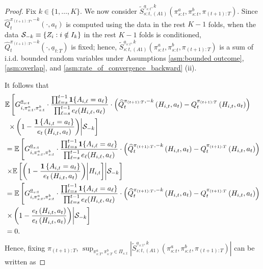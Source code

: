 \begin{proof}
Fix $k \in \{1,\ldots,K\}$. We now consider $\widetilde{S}_{s:t,(A1)}^{\underline{a}_{s:t},k}(\pi_{s:t}^{a},\pi_{s:t}^{b},\pi_{(t+1):T})$. Since $\widehat{Q}_{t}^{\pi_{(t+1):T},-k}(\cdot,a_{t})$ is computed using the data in the rest $K-1$ folds, when the data $\mathcal{S}_{-k} \equiv \{Z_i : i \notin I_{k}\}$ in the rest $K-1$ folds is conditioned,  $\widehat{Q}_{t}^{\pi_{(t+1):T},-k}(\cdot,\underline{a}_{t:T})$ is fixed; hence, $\widetilde{S}_{s:t,(A1)}^{\underline{a}_{s:t},k}(\pi_{s:t}^{a},\pi_{s:t}^{b},\pi_{(t+1):T})$ is a sum of i.i.d. bounded random variables under Assumptions \ref{asm:bounded outcome}, \ref{asm:overlap}, and \ref{asm:rate_of_convergence_backward} (ii).

It follows that 
\begin{align*}
&\mathbb{E}\left[G_{i,\pi_{s:t}^{a},\pi_{s:t}^{b}}^{\underline{a}_{s:t}}\cdot\frac{\prod_{\ell=s}^{t-1}\mathbf{1}\{A_{i,\ell}=a_{\ell}\}}{\prod_{\ell=s}^{t-1}e_{\ell}(H_{i,\ell},a_{\ell})}\cdot\left(\widehat{Q}_{t}^{\pi_{(t+1):T},-k}\left(H_{i,t},a_{t}\right)-Q_{t}^{\pi_{(t+1):T}}\left(H_{i,t},a_{t}\right)\right) \right. \\ & \left. \  \times \left(1-\frac{\mathbf{1}\left\{ A_{i,t}=a_{t}\right\} }{e_{t}\left(H_{i,t},a_{t}\right)}\right)\middle| \mathcal{S}_{-k}\right]\\
&=	\mathbb{E}\left[G_{i,\pi_{s:t}^{a},\pi_{s:t}^{b}}^{\underline{a}_{s:t}}\cdot\frac{\prod_{\ell=s}^{t-1}\mathbf{1}\{A_{i,\ell}=a_{\ell}\}}{\prod_{\ell=s}^{t-1}e_{\ell}(H_{i,\ell},a_{\ell})} \cdot \left(\widehat{Q}_{t}^{\pi_{(t+1):T},-k}\left(H_{i,t},a_{t}\right)-Q_{t}^{\pi_{(t+1):T}}\left(H_{i,t},a_{t}\right)\right)\right. \\ 
& \left. \times \mathbb{E}\left[\left(1-\frac{\mathbf{1}\left\{ A_{i,t}=a_{t}\right\} }{e_{t}\left(H_{i,t},a_{t}\right)}\right)\middle| H_{i,t}\right]\middle|\mathcal{S}_{-k} \right]\\
&=	\mathbb{E}\left[G_{i,\pi_{s:t}^{a},\pi_{s:t}^{b}}^{\underline{a}_{s:t}}\cdot\frac{\prod_{\ell=s}^{t-1}\mathbf{1}\{A_{i,\ell}=a_{\ell}\}}{\prod_{\ell=s}^{t-1}e_{\ell}(H_{i,\ell},a_{\ell})} \cdot \left(\widehat{Q}_{t}^{\pi_{(t+1):T},-k}\left(H_{i,t},a_{t}\right)-Q_{t}^{\pi_{(t+1):T}}\left(H_{i,t},a_{t}\right)\right)\right. \\ 
& \left. \times \left(1-\frac{e_{t}\left(H_{i,t},a_{t}\right)}{e_{t}\left(H_{i,t},a_{t}\right)}\right)\middle|\mathcal{S}_{-k} \right]\\
&=	0.
\end{align*}
Hence, fixing $\pi_{(t+1):T}$, $\sup_{\pi_{s:T}^{a},\pi_{s:T}^{b}\in \Pi_{s:t}} \left| \widetilde{S}_{s:t,(A1)}^{\underline{a}_{s:t},k}(\pi_{s:t}^{a},\pi_{s:t}^{b},\pi_{(t+1):T})\right|$ can be written as

\end{proof}
